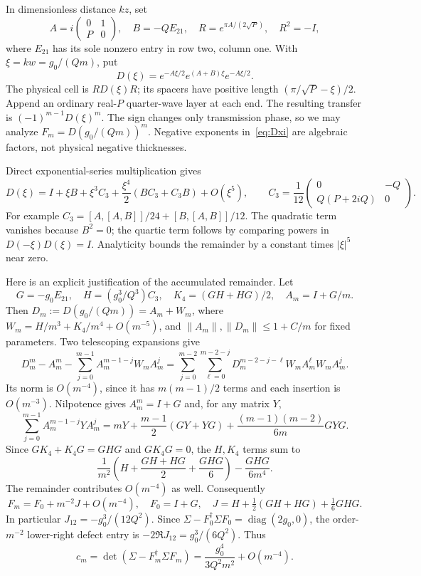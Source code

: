 \documentclass[11pt,a4paper]{article}
\theoremstyle{remark}
\newcommand{\norm}[1]{\lVert #1\rVert}
\newcommand{\abs}[1]{\lvert #1\rvert}
\newcommand{\diag}{\operatorname{diag}}
\begin{document}
In dimensionless distance $kz$, set
\[
 A=i\begin{pmatrix}0&1\\P&0\end{pmatrix},\quad B=-QE_{21},\quad
 R=e^{\pi A/(2\sqrt P)},\quad R^2=-I,
\]
where $E_{21}$ has its sole nonzero entry in row two, column one. With $\xi=kw=g_0/(Qm)$, put
\begin{equation}\label{eq:Dxi}
 D(\xi)=e^{-A\xi/2}e^{(A+B)\xi}e^{-A\xi/2}.
\end{equation}
The physical cell is $RD(\xi)R$; its spacers have positive length $(\pi/\sqrt P-\xi)/2$. Append an ordinary real-$P$ quarter-wave layer at each end. The resulting transfer is $(-1)^{m-1}D(\xi)^m$. The sign changes only transmission phase, so we may analyze $F_m=D(g_0/(Qm))^m$. Negative exponents in~\eqref{eq:Dxi} are algebraic factors, not physical negative thicknesses.

Direct exponential-series multiplication gives
\begin{equation}\label{eq:product-expansion}
 D(\xi)=I+\xi B+\xi^3C_3+\frac{\xi^4}{2}(BC_3+C_3B)+O(\xi^5),\qquad
 C_3=\frac1{12}\begin{pmatrix}0&-Q\\Q(P+2iQ)&0\end{pmatrix}.
\end{equation}
For example $C_3=[A,[A,B]]/24+[B,[A,B]]/12$. The quadratic term vanishes because $B^2=0$; the quartic term follows by comparing powers in $D(-\xi)D(\xi)=I$. Analyticity bounds the remainder by a constant times $\abs\xi^5$ near zero.

Here is an explicit justification of the accumulated remainder. Let
\[
 G=-g_0E_{21},\quad H=(g_0^3/Q^3)C_3,\quad K_4=(GH+HG)/2,\quad
 A_m=I+G/m.
\]
Then $D_m:=D(g_0/(Qm))=A_m+W_m$, where $W_m=H/m^3+K_4/m^4+O(m^{-5})$, and $\norm{A_m},\norm{D_m}\leq1+C/m$ for fixed parameters. Two telescoping expansions give
\[
 D_m^m-A_m^m-\sum_{j=0}^{m-1}A_m^{m-1-j}W_mA_m^j
 =\sum_{j=0}^{m-2}\sum_{\ell=0}^{m-2-j}
 D_m^{m-2-j-\ell}W_mA_m^\ell W_mA_m^j.
\]
Its norm is $O(m^{-4})$, since it has $m(m-1)/2$ terms and each insertion is $O(m^{-3})$. Nilpotence gives $A_m^m=I+G$ and, for any matrix $Y$,
\[
 \sum_{j=0}^{m-1}A_m^{m-1-j}YA_m^j
 =mY+\frac{m-1}{2}(GY+YG)
  +\frac{(m-1)(m-2)}{6m}GYG.
\]
Since $GK_4+K_4G=GHG$ and $GK_4G=0$, the $H,K_4$ terms sum to
\[
 \frac1{m^2}\left(H+\frac{GH+HG}{2}+\frac{GHG}{6}\right)
 -\frac{GHG}{6m^4}.
\]
The remainder contributes $O(m^{-4})$ as well. Consequently
\begin{equation}\label{eq:Fm}
 F_m=F_0+m^{-2}J+O(m^{-4}),\quad
 F_0=I+G,\quad J=H+\tfrac12(GH+HG)+\tfrac16GHG.
\end{equation}
In particular $J_{12}=-g_0^3/(12Q^2)$. Since $\Sigma-F_0^\dagger\Sigma F_0=\diag(2g_0,0)$, the order-$m^{-2}$ lower-right defect entry is $-2\Re J_{12}=g_0^3/(6Q^2)$. Thus
\begin{equation}\label{eq:cm}
 c_m=\det(\Sigma-F_m^\dagger\Sigma F_m)
 =\frac{g_0^4}{3Q^2m^2}+O(m^{-4}).
\end{equation}
\end{document}
